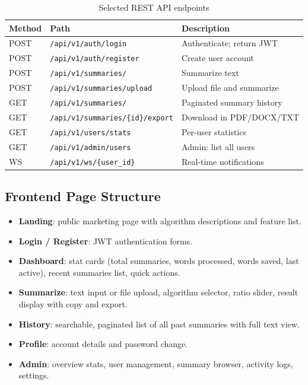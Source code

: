 \documentclass[12pt,a4paper]{article}
\begin{document}
\begin{table}[H]
  \centering
  \caption{Selected REST API endpoints}
  \begin{tabular}{@{}lll@{}}
    \toprule
    \textbf{Method} & \textbf{Path} & \textbf{Description} \\
    \midrule
    POST & \texttt{/api/v1/auth/login}         & Authenticate; return JWT \\
    POST & \texttt{/api/v1/auth/register}       & Create user account \\
    POST & \texttt{/api/v1/summaries/}          & Summarize text \\
    POST & \texttt{/api/v1/summaries/upload}    & Upload file and summarize \\
    GET  & \texttt{/api/v1/summaries/}          & Paginated summary history \\
    GET  & \texttt{/api/v1/summaries/\{id\}/export} & Download in PDF/DOCX/TXT \\
    GET  & \texttt{/api/v1/users/stats}         & Per-user statistics \\
    GET  & \texttt{/api/v1/admin/users}         & Admin: list all users \\
    WS   & \texttt{/api/v1/ws/\{user\_id\}}    & Real-time notifications \\
    \bottomrule
  \end{tabular}
\end{table}

\subsection{Frontend Page Structure}

\begin{itemize}[noitemsep]
  \item \textbf{Landing}: public marketing page with algorithm descriptions and feature list.
  \item \textbf{Login / Register}: JWT authentication forms.
  \item \textbf{Dashboard}: stat cards (total summaries, words processed, words saved, last active), recent summaries list, quick actions.
  \item \textbf{Summarize}: text input or file upload, algorithm selector, ratio slider, result display with copy and export.
  \item \textbf{History}: searchable, paginated list of all past summaries with full text view.
  \item \textbf{Profile}: account details and password change.
  \item \textbf{Admin}: overview stats, user management, summary browser, activity logs, settings.
\end{itemize}
\end{document}
